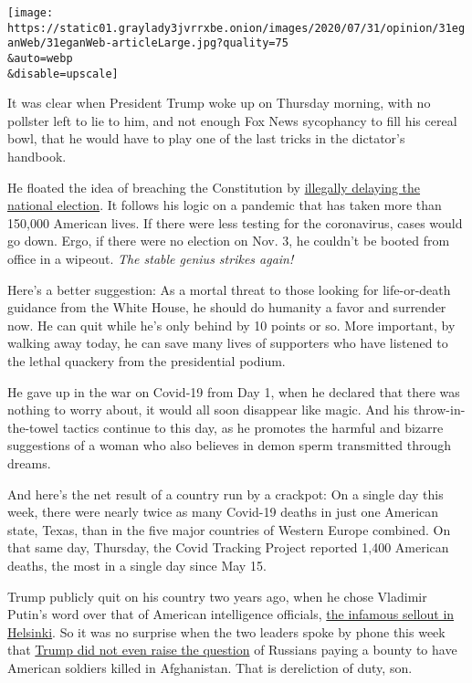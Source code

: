 \texttt{[image: https://static01.graylady3jvrrxbe.onion/images/2020/07/31/opinion/31eganWeb/31eganWeb-articleLarge.jpg?quality=75\\\&auto=webp\\\&disable=upscale]}

It was clear when President Trump woke up on Thursday morning, with no
pollster left to lie to him, and not enough Fox News sycophancy to fill
his cereal bowl, that he would have to play one of the last tricks in
the dictator's handbook.

He floated the idea of breaching the Constitution by
\href{https://www.nytimes3xbfgragh.onion/2020/07/30/us/elections/biden-vs-trump.html}{illegally
delaying the national election}. It follows his logic on a pandemic that
has taken more than 150,000 American lives. If there were less testing
for the coronavirus, cases would go down. Ergo, if there were no
election on Nov. 3, he couldn't be booted from office in a wipeout.
\emph{The stable genius strikes again!}

Here's a better suggestion: As a mortal threat to those looking for
life-or-death guidance from the White House, he should do humanity a
favor and surrender now. He can quit while he's only behind by 10 points
or so. More important, by walking away today, he can save many lives of
supporters who have listened to the lethal quackery from the
presidential podium.

He gave up in the war on Covid-19 from Day 1, when he declared that
there was nothing to worry about, it would all soon disappear like
magic. And his throw-in-the-towel tactics continue to this day, as he
promotes the harmful and bizarre suggestions of a woman who also
believes in demon sperm transmitted through dreams.

And here's the net result of a country run by a crackpot: On a single
day this week, there were nearly twice as many Covid-19 deaths in just
one American state, Texas, than in the five major countries of Western
Europe combined. On that same day, Thursday, the Covid Tracking Project
reported 1,400 American deaths, the most in a single day since May 15.

Trump publicly quit on his country two years ago, when he chose Vladimir
Putin's word over that of American intelligence officials,
\href{https://www.nytimes3xbfgragh.onion/2018/07/16/opinion/putin-trump-meeting-helsinki.html}{the
infamous sellout in Helsinki}. So it was no surprise when the two
leaders spoke by phone this week that
\href{https://www.nytimes3xbfgragh.onion/2020/07/29/us/politics/trump-putin-bounties.html}{Trump
did not even raise the question} of Russians paying a bounty to have
American soldiers killed in Afghanistan. That is dereliction of duty,
son.

